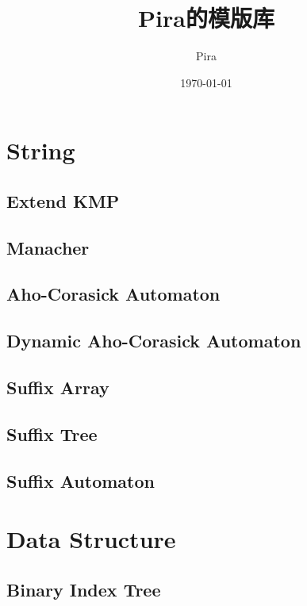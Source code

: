 \documentclass[utf8,8pt]{article}
\title{Pira的模版库}
\author{Pira}
\date{\today}
\begin{document}
\begin{CJK}{UTF8}{gbsn}
\maketitle

\tableofcontents

\clearpage

\section{String}
	\subsection{Extend KMP}
		
	\subsection{Manacher}
		
	\subsection{Aho-Corasick Automaton}
		
	\subsection{Dynamic Aho-Corasick Automaton}
		
	\subsection{Suffix Array}
		
	\subsection{Suffix Tree}
		
	\subsection{Suffix Automaton}
		
\clearpage

\section{Data Structure}
	\subsection{Binary Index Tree}
		

\end{CJK}
\end{document}
